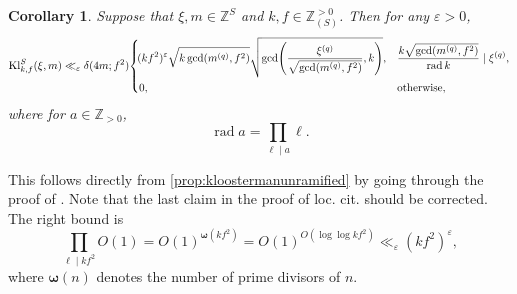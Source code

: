 \documentclass[10pt,oneside,reqno]{amsart}
\makeatletter
\newcommand\ZZ{\mathbb{Z}}
\DeclareMathOperator\rad{rad}
\newcommand\Kl{\mathrm{Kl}}
\theoremstyle{THEOREM}
\newtheorem{corollary}[theorem]{Corollary}
\theoremstyle{DEFINITION}
\theoremstyle{EXERCISE}
\numberwithin{equation}{section}
\renewenvironment{proof}[1][\proofname]{\par
  \vspace{-6pt}
  \pushQED{\qed}
  \normalfont \topsep6\p@\@plus6\p@\relax
  \trivlist
  \item[\hskip\labelsep\rmfamily\bfseries
    #1\@addpunct{:}]\ignorespaces
}{
  \popQED\endtrivlist\@endpefalse
  \vspace{-6pt}
}
\makeatother
\begin{document}
\begin{corollary}\label{cor:kloostermanfinal}
Suppose that $\xi,m\in \ZZ^S$ and $k,f\in \ZZ_{(S)}^{>0}$. Then for any $\varepsilon>0$,
\[
\Kl_{k,f}^S(\xi,m)
   \ll_\varepsilon  \delta(4m;f^2)\!\begin{dcases}
             \!(kf^2)^\varepsilon\sqrt{k\gcd(m^{(q)},f^2)}\sqrt{\gcd\!\left( \frac{\xi^{(q)}}{\sqrt{\gcd(m^{(q)},f^2)}},k\right)}, &\frac{k\sqrt{\gcd(m^{(q)},f^2)}}{\rad k}\mid \xi^{(q)},  \\
              0, &\text{otherwise},
            \end{dcases}
\]
where for $a\in \ZZ_{>0}$,
\[
\rad a=\prod_{\ell\mid a}\ell.
\]
\end{corollary}
\begin{proof}
This follows directly from \autoref{prop:kloostermanunramified} by going through the proof of \cite[Corllary B.8]{altug2017}. Note that the last claim in the proof of loc. cit. should be corrected. The right bound is
\[
\prod_{\ell\mid kf^2}O(1)=O(1)^{\bm{\omega}(kf^2)}=O(1)^{O(\log\log kf^2)}\ll_\varepsilon(kf^2)^\varepsilon,
\]
where $\bm{\omega}(n)$ denotes the number of prime divisors of $n$.
\end{proof}



\end{document}
